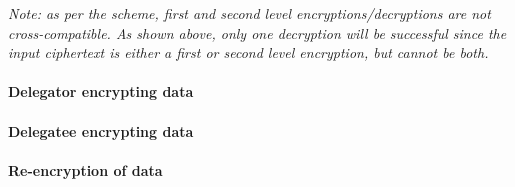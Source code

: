 



\textit{Note: as per the \cite{afgh:2006:article} scheme, first and second level encryptions/decryptions are not cross-compatible. As shown above, only one decryption will be successful since the input ciphertext is either a first or second level encryption, but cannot be both.}

\paragraph{Delegator encrypting data}

\paragraph{Delegatee encrypting data}

\paragraph{Re-encryption of data}

